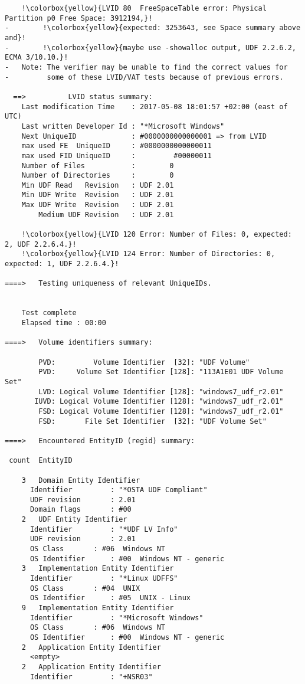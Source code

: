 \begin{lstlisting}
    !\colorbox{yellow}{LVID 80  FreeSpaceTable error: Physical Partition p0 Free Space: 3912194,}!
-        !\colorbox{yellow}{expected: 3253643, see Space summary above and}!
-        !\colorbox{yellow}{maybe use -showalloc output, UDF 2.2.6.2, ECMA 3/10.10.}!
-   Note: The verifier may be unable to find the correct values for
-         some of these LVID/VAT tests because of previous errors.

  ==>          LVID status summary:
    Last modification Time    : 2017-05-08 18:01:57 +02:00 (east of UTC)
    Last written Developer Id : "*Microsoft Windows"
    Next UniqueID             : #0000000000000001 => from LVID
    max used FE  UniqueID     : #0000000000000011
    max used FID UniqueID     :         #00000011
    Number of Files           :        0
    Number of Directories     :        0
    Min UDF Read   Revision   : UDF 2.01
    Min UDF Write  Revision   : UDF 2.01
    Max UDF Write  Revision   : UDF 2.01
        Medium UDF Revision   : UDF 2.01

    !\colorbox{yellow}{LVID 120 Error: Number of Files: 0, expected: 2, UDF 2.2.6.4.}!
    !\colorbox{yellow}{LVID 124 Error: Number of Directories: 0, expected: 1, UDF 2.2.6.4.}!

====>   Testing uniqueness of relevant UniqueIDs.


    Test complete
    Elapsed time : 00:00

====>   Volume identifiers summary:

        PVD:         Volume Identifier  [32]: "UDF Volume"
        PVD:     Volume Set Identifier [128]: "113A1E01 UDF Volume Set"
        LVD: Logical Volume Identifier [128]: "windows7_udf_r2.01"
       IUVD: Logical Volume Identifier [128]: "windows7_udf_r2.01"
        FSD: Logical Volume Identifier [128]: "windows7_udf_r2.01"
        FSD:       File Set Identifier  [32]: "UDF Volume Set"

====>   Encountered EntityID (regid) summary:

 count  EntityID

    3   Domain Entity Identifier
      Identifier         : "*OSTA UDF Compliant"
      UDF revision       : 2.01
      Domain flags       : #00
    2   UDF Entity Identifier
      Identifier         : "*UDF LV Info"
      UDF revision       : 2.01
      OS Class       : #06  Windows NT
      OS Identifier      : #00  Windows NT - generic
    3   Implementation Entity Identifier
      Identifier         : "*Linux UDFFS"
      OS Class       : #04  UNIX
      OS Identifier      : #05  UNIX - Linux
    9   Implementation Entity Identifier
      Identifier         : "*Microsoft Windows"
      OS Class       : #06  Windows NT
      OS Identifier      : #00  Windows NT - generic
    2   Application Entity Identifier
      <empty>
    2   Application Entity Identifier
      Identifier         : "+NSR03"


\end{lstlisting}
